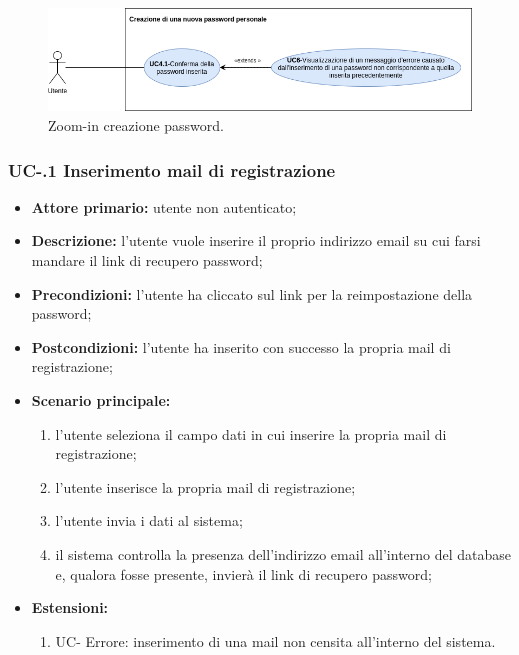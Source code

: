 \begin{figure}[H]
	\centering
	\includegraphics[width=\textwidth]{src/CasiDUso/immagini/SottocasoCreazionePassword.png}
	\caption{Zoom-in creazione password.}
\end{figure}


\subsubsection{UC-.1 Inserimento mail di registrazione}
\begin{itemize}
	\item \textbf{Attore primario:} utente non autenticato;

	\item \textbf{Descrizione:} l'utente vuole inserire il proprio indirizzo email su cui farsi mandare il link di recupero password;

	\item \textbf{Precondizioni:} l'utente ha cliccato sul link per la reimpostazione della password;

	\item \textbf{Postcondizioni:} l'utente ha inserito con successo la propria mail di registrazione;

	\item \textbf{Scenario principale:}
	      \begin{enumerate}
		      \item l'utente seleziona il campo dati in cui inserire la propria mail di registrazione;
		      \item l'utente inserisce la propria mail di registrazione;
		      \item l'utente invia i dati al sistema;
		      \item il sistema controlla la presenza dell'indirizzo email all'interno del database e, qualora fosse presente, invierà il link di recupero password;
	      \end{enumerate}
	\item \textbf{Estensioni:}
	      \begin{enumerate}
		      \item UC- Errore: inserimento di una mail non censita all'interno del sistema.
	      \end{enumerate}
\end{itemize}


